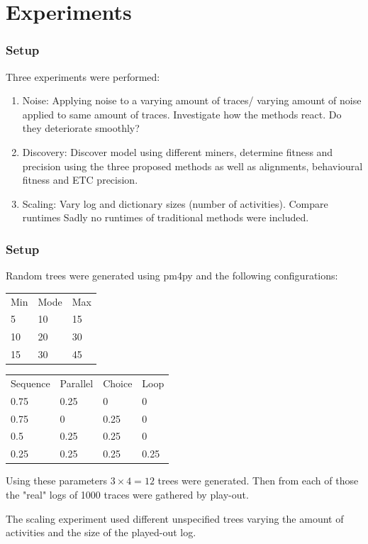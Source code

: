 \documentclass{beamer}
\begin{document}
	\section{Experiments}
	\begin{frame}
		\frametitle{Setup}
		Three experiments were performed:
		\begin{enumerate}
			\item Noise: Applying noise to a varying amount of traces/ varying amount of noise applied to same amount of traces. Investigate how the methods react. Do they deteriorate smoothly?
			\item Discovery: Discover model using different miners, determine fitness and precision using the three proposed methods as well as alignments, behavioural fitness and ETC precision.
			\item Scaling: Vary log and dictionary sizes (number of activities). Compare runtimes \alert{Sadly no runtimes of traditional methods were included.}
		\end{enumerate}
	\end{frame}
	\begin{frame}
		\frametitle{Setup}
		Random trees were generated using pm4py and the following configurations:
		
		\begin{tabular}{lll}
			Min & Mode & Max \\
			5 & 10 & 15 \\
			10 & 20 & 30 \\
			15 & 30 & 45 \\
		\end{tabular}
		\begin{tabular}{llll}
			Sequence & Parallel & Choice & Loop \\
			0.75 & 0.25 & 0 & 0 \\
			0.75 & 0 & 0.25 & 0 \\
			0.5 & 0.25 & 0.25 & 0 \\
			0.25 & 0.25 & 0.25 & 0.25 \\
		\end{tabular}
		
		Using these parameters $3\times4=12$ trees were generated.
		Then from each of those the "real" logs of 1000 traces were gathered by play-out.
		
		The scaling experiment used different unspecified trees varying the amount of activities and the size of the played-out log.
	\end{frame}
\end{document}
